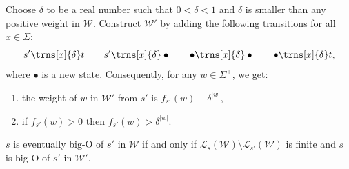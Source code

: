 \documentclass{lmcs}
\theoremstyle{plain}
\theoremstyle{definition}
\theoremstyle{remark}
\newcommand\lng[2]{\mathcal{L}_{#1}(#2)}
\newcommand\wa{\mathcal{W}}
\renewcommand\nu{f}
\begin{document}
Choose $\delta$ to be a real number such that $0 < \delta < 1$ and $\delta$ is smaller than any positive weight in $\wa$.
Construct $\wa'$ by adding the following transitions for all $x\in\Sigma$:
\[
s'\trns[x]{\delta} t \qquad s'\trns[x]{\delta} \bullet \qquad \bullet \trns[x]{\delta} \bullet \qquad \bullet \trns[x]{\delta} t,
\]
where $\bullet$ is a new state. Consequently, for any $w\in\Sigma^+$, we get:
\begin{enumerate}
\item the weight of $w$ in $\wa'$ from $s'$ is $\nu_{s'}(w)+\delta^{|w|}$,
\item if $\nu_{s'}(w)>0$ then $\nu_{s'}(w) > \delta^{|w|}$.
\end{enumerate}
\begin{prop}
$s$ is eventually big-O of $s'$ in $\wa$ if and only if $\lng{s}{\wa}\setminus\lng{s'}{\wa}$ is finite and $s$ is big-O of $s'$ in $\wa'$.
\end{prop}
\end{document}
